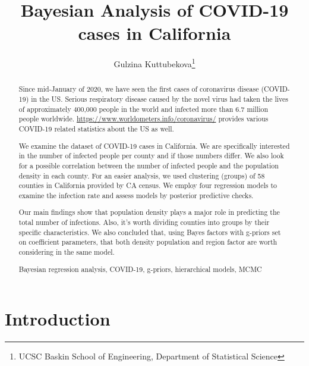 \documentclass[11pt,twocolumn]{asaproc}
\title{Bayesian Analysis of COVID-19 cases in California}
\author{Gulzina Kuttubekova\thanks{UCSC Baskin School of Engineering, Department of Statistical Science}}
\begin{document}
\maketitle





\begin{abstract} 
 Since mid-January of 2020, we have seen the first cases of coronavirus disease (COVID-19) in the US. Serious respiratory disease caused by the novel virus had taken the lives of approximately 400,000 people in the world and infected more than 6.7 million people worldwide. \url{https://www.worldometers.info/coronavirus/} provides various COVID-19 related statistics about the US as well.

We examine the dataset of COVID-19 cases in California. We are specifically interested in the number of infected people per county and if those numbers differ. We also look for a possible correlation between the number of infected people and the population density in each county. For an easier analysis, we used clustering (groups) of 58 counties in California provided by CA census. We employ four regression models to examine the infection rate and assess models by posterior predictive checks. 

Our main findings show that population density plays a major role in predicting the total number of infections. Also, it's worth dividing counties into groups by their specific characteristics. We also concluded that, using Bayes factors with g-priors set on coefficient parameters, that both density population and region factor are worth considering in the same model. 


\begin{keywords}
Bayesian regression analysis, COVID-19, g-priors, hierarchical models, MCMC
\end{keywords}
\end{abstract}







\section{Introduction\label{Introduction}}
\end{document}
